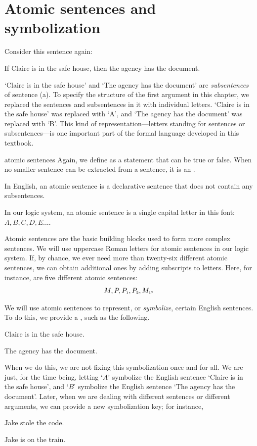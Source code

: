 \filbreak

\section{Atomic sentences and symbolization}\label{s:atomic}

Consider this sentence again:
	\begin{earg}
		\item[(a)] If Claire is in the safe house, then the agency has the document.
	\end{earg}
`Claire is in the safe house' and `The agency has the document' are \textit{subsentences} of sentence (a). To specify the structure of the first argument in this chapter, we replaced the sentences and subsentences in it with individual letters. `Claire is in the safe house' was replaced with `A', and `The agency has the document' was replaced with `B'. This kind of representation---letters standing for sentences or subsentences---is one important part of the formal language developed in this textbook.

\begin{factboxy}{atomic sentences}
Again, we define  as a statement that can be true or false. When no smaller sentence can be extracted from a sentence, it is an .\medskip

In English, an atomic sentence is a declarative sentence that does not contain any subsentences.\smallskip

In our logic system, an atomic sentence is a single capital letter in this font: $A, B, C, D, E . . .$.
\end{factboxy}

Atomic sentences are the basic building blocks used to form more complex sentences. We will use uppercase Roman letters for atomic sentences in our logic system. If, by chance, we ever need more than twenty-six different atomic sentences, we can obtain additional ones by adding subscripts to letters. Here, for instance, are five different atomic sentences:
	$$M, P, P_{\text{\tiny 1}}, P_{\text{\tiny 2}}, M_{\text{\tiny 17}}$$

We will use atomic sentences to represent, or \emph{symbolize}, certain English sentences. To do this, we provide a , such as the following.
	\begin{ekey}
		\item[A] Claire is in the safe house.
		\item[B] The agency has the document.
	\end{ekey}
When we do this, we are not fixing this symbolization once and for all. We are just, for the time being, letting `$A$' symbolize the English sentence `Claire is in the safe house', and `$B$' symbolize the English sentence `The agency has the document'. Later, when we are dealing with different sentences or different arguments, we can provide a new symbolization key; for instance, 
	\begin{ekey}
		\item[A] Jake stole the code.
		\item[B] Jake is on the train.
	\end{ekey}



